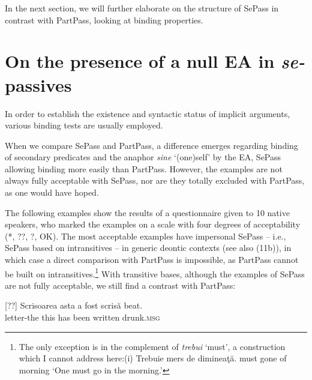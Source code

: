 \documentclass[output=paper]{langsci/langscibook}
\begin{document}
In the next section, we will further elaborate on the structure of SePass in contrast with PartPass, looking at binding properties.

\section{On the presence of a null EA in \textit{se-}passives}%
 
In order to establish the existence and syntactic status of implicit arguments, various binding tests are usually employed.
 
When we compare SePass and PartPass, a difference emerges regarding binding of secondary predicates and the anaphor \textit{sine} ‘(one)self’ by the EA, SePass allowing binding more easily than PartPass. However, the examples are not always fully acceptable with SePass, nor are they totally excluded with PartPass, as one would have hoped.
 
The following examples show the results of a questionnaire given to 10 native speakers, who marked the examples on a scale with four degrees of acceptability (*, ??, ?, OK). The most acceptable examples have impersonal SePass – i.e., SePass based on intransitives – in generic deontic contexts (see also (11b)), in which case a direct comparison with PartPass is impossible, as PartPass cannot be built on intransitives.\footnote{The only exception is in the complement of \textit{trebui} ‘must’, a construction which I cannot address here:(i)  Trebuie mers de dimineaţă.  must     gone  of morning  ‘One must go in the morning.’} With transitive bases, although the examples of SePass are not fully acceptable, we still find a contrast with PartPass:

\settowidth{}
\ea%
    \label{ex:giurgea:41}
    \begin{xlista}
[??]{
    \gll Scrisoarea asta a    fost   scrisă   beat.        \\
         letter-the   this has been written drunk.\textsc{msg}\\}
\end{xlista}
\z
\end{document}
